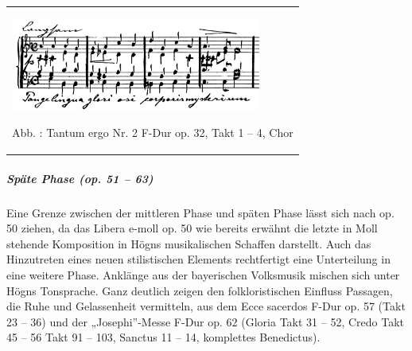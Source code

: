 \documentclass[a4paper]{article}
\newcounter{Abb}
\renewcommand\theAbb{\arabic{Abb}}
\begin{document}
\begin{center}
\tablefirsthead{}
\tablehead{}
\tabletail{}
\tablelasttail{}
\begin{supertabular}{m{8.399cm}}
{%
\includegraphics[width=8.216cm,height=3.006cm]{pictures/zulassungsarbeit-img099.png}
 \par}
Abb. \stepcounter{Abb}{\theAbb}: Tantum ergo Nr. 2 F-Dur op. 32, Takt 1
– 4, Chor\\
\end{supertabular}
\end{center}
\subparagraph[Späte Phase (op. 51 – 63)]{Späte Phase (op. 51 – 63)}
Eine Grenze zwischen der mittleren Phase und späten Phase lässt sich
nach op. 50 ziehen, da das Libera e-moll op. 50 wie bereits erwähnt die
letzte in Moll stehende Komposition in Högns musikalischen Schaffen
darstellt. Auch das Hinzutreten eines neuen stilistischen Elements
rechtfertigt eine Unterteilung in eine weitere Phase. Anklänge aus der
bayerischen Volksmusik mischen sich unter Högns Tonsprache. Ganz
deutlich zeigen den folkloristischen Einfluss Passagen, die Ruhe und
Gelassenheit vermitteln, aus dem Ecce sacerdos F-Dur op. 57 (Takt 23 –
36) und der „Josephi”-Messe F-Dur op. 62 (Gloria Takt 31 – 52, Credo
Takt 45 – 56 Takt 91 – 103, Sanctus 11 – 14, komplettes Benedictus).
\end{document}
